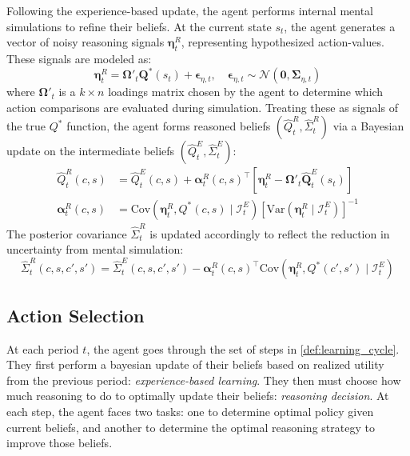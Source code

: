 \begin{definition} \label{def:reasoning_learning_update}
    Following the experience-based update, the agent performs internal mental 
    simulations to refine their beliefs. At the current state $s_t$, the agent 
    generates a vector of noisy reasoning signals $\boldsymbol{\eta}^R_t$, 
    representing hypothesized action-values. These signals are modeled as:
    \begin{equation}
        \boldsymbol{\eta}^R_t = \boldsymbol{\Omega}'_t \boldsymbol{Q}^*(s_t) + \boldsymbol{\epsilon}_{\eta, t}, \quad \boldsymbol{\epsilon}_{\eta, t} \sim \mathcal{N}(\boldsymbol{0}, \boldsymbol{\Sigma}_{\eta, t})
    \end{equation}
    where $\boldsymbol{\Omega}'_t$ is a $k \times n$ loadings matrix chosen by the 
    agent to determine which action comparisons are evaluated during simulation. 
    Treating these as signals of the true $Q^*$ function, the agent forms reasoned 
    beliefs $(\hat{Q}^R_t, \hat{\Sigma}^R_t)$ via a Bayesian update on the intermediate 
    beliefs $(\hat{Q}^E_t, \hat{\Sigma}^E_t)$:
    \begin{align}
        \hat{Q}^R_t(c,s) &= \hat{Q}^E_t(c,s) + \boldsymbol{\alpha}^R_t(c,s)^\top \left[\boldsymbol{\eta}^R_t - \boldsymbol{\Omega}'_t \hat{\boldsymbol{Q}}^E_t(s_t)\right] \\
        \boldsymbol{\alpha}^R_t(c,s) &= \text{Cov}(\boldsymbol{\eta}^R_t, Q^*(c,s) \mid \mathcal{I}^E_t) \left[\text{Var}(\boldsymbol{\eta}^R_t \mid \mathcal{I}^E_t)\right]^{-1}
    \end{align}
    The posterior covariance $\hat{\Sigma}^R_t$ is updated accordingly to reflect the reduction in uncertainty from mental simulation:
    \begin{equation}
        \hat{\Sigma}^R_t(c,s,c',s') = \hat{\Sigma}^E_t(c,s,c',s') - \boldsymbol{\alpha}^R_t(c,s)^\top \text{Cov}(\boldsymbol{\eta}^R_t, Q^*(c',s') \mid \mathcal{I}^E_t)
    \end{equation}
\end{definition}

\subsection{Action Selection} \label{subsec:action_selection}

At each period $t$, the agent goes through the set of steps in \ref{def:learning_cycle}. They first perform a bayesian
update of their beliefs based on realized utility from the previous period: \textit{experience-based learning}.
They then must choose how much reasoning to do to optimally update their beliefs: \textit{reasoning decision}.
At each step, the agent faces two tasks: one to determine optimal policy given current beliefs, and another to determine
the optimal reasoning strategy to improve those beliefs.


